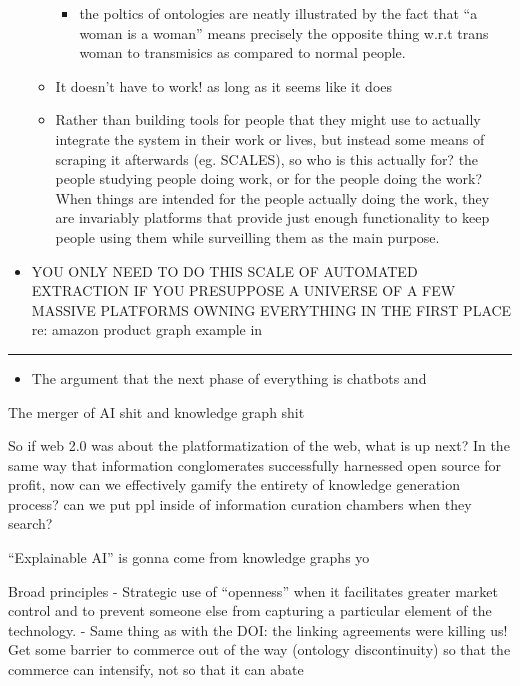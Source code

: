 \begin{itemize}
\begin{itemize}
\begin{itemize}
    \item
      the poltics of ontologies are neatly illustrated by the fact that
      ``a woman is a woman'' means precisely the opposite thing w.r.t
      trans woman to transmisics as compared to normal people.
    \end{itemize}
  \item
    It doesn't have to work! as long as it seems like it does
  \item
    Rather than building tools for people that they might use to
    actually integrate the system in their work or lives, but instead
    some means of scraping it afterwards (eg. SCALES), so who is this
    actually for? the people studying people doing work, or for the
    people doing the work? When things are intended for the people
    actually doing the work, they are invariably platforms that provide
    just enough functionality to keep people using them while
    surveilling them as the main purpose.
  \end{itemize}
\item
  YOU ONLY NEED TO DO THIS SCALE OF AUTOMATED EXTRACTION IF YOU
  PRESUPPOSE A UNIVERSE OF A FEW MASSIVE PLATFORMS OWNING EVERYTHING IN
  THE FIRST PLACE re: amazon product graph example in \cite{chaudhriKnowledgeGraphsIntroduction2022} 
\end{itemize}

\begin{center}\rule{0.5\linewidth}{0.5pt}\end{center}

\begin{itemize}

\item
  The argument that the next phase of everything is chatbots and
\end{itemize}

The merger of AI shit and knowledge graph shit

So if web 2.0 was about the platformatization of the web, what is up
next? In the same way that information conglomerates successfully
harnessed open source for profit, now can we effectively gamify the
entirety of knowledge generation process? can we put ppl inside of
information curation chambers when they search?

``Explainable AI'' is gonna come from knowledge graphs yo

Broad principles - Strategic use of ``openness'' when it facilitates
greater market control and to prevent someone else from capturing a
particular element of the technology. - Same thing as with the DOI: the
linking agreements were killing us! Get some barrier to commerce out of
the way (ontology discontinuity) so that the commerce can intensify, not
so that it can abate

